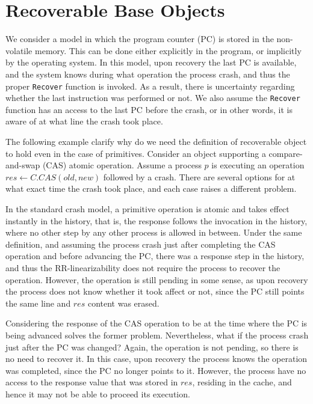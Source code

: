 
\section{Recoverable Base Objects}
\label{section: Recoverable Base Objects}

We consider a model in which the program counter (PC) is stored in the non-volatile memory. This can be done either explicitly in the program, or implicitly by the operating system. In this model, upon recovery the last PC is available, and the system knows during what operation the process crash, and thus the proper \texttt{Recover} function is invoked. As a result, there is uncertainty regarding whether the last instruction was performed or not. We also assume the \texttt{Recover} function has an access to the last PC before the crash, or in other words, it is aware of at what line the crash took place.

The following example clarify why do we need the definition of recoverable object to hold even in the case of primitives.
Consider an object supporting a compare-and-swap (CAS) atomic operation. Assume a process $p$ is executing an operation $res \leftarrow C.CAS(old,new)$ followed by a crash. There are several options for at what exact time the crash took place, and each case raises a different problem.

In the standard crash model, a primitive operation is atomic and takes effect instantly in the history, that is, the response follows the invocation in the history, where no other step by any other process is allowed in between. Under the same definition, and assuming the process crash just after completing the CAS operation and before advancing the PC, there was a response step in the history, and thus the RR-linearizability does not require the process to recover the operation. However, the operation is still pending in some sense, as upon recovery the process does not know whether it took affect or not, since the PC still points the same line and $res$ content was erased.

Considering the response of the CAS operation to be at the time where the PC is being advanced solves the former problem. Nevertheless, what if the process crash just after the PC was changed? Again, the operation is not pending, so there is no need to recover it. In this case, upon recovery the process knows the operation was completed, since the PC no longer points to it. However, the process have no access to the response value that was stored in $res$, residing in the cache, and hence it may not be able to proceed its execution.

